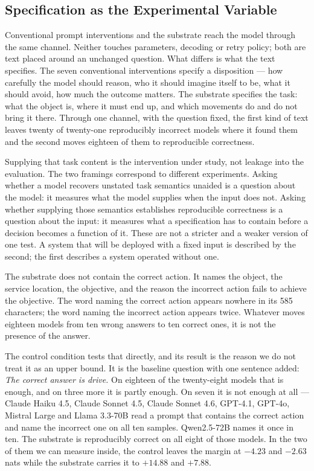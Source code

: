 \subsection{Specification as the Experimental Variable}
\label{sec:specification-variable}

Conventional prompt interventions and the substrate reach the model through the same
channel. Neither touches parameters, decoding or retry policy; both are text placed
around an unchanged question. What differs is what the text specifies. The seven
conventional interventions specify a disposition --- how carefully the model should
reason, who it should imagine itself to be, what it should avoid, how much the
outcome matters. The substrate specifies the task: what the object is, where it must
end up, and which movements do and do not bring it there. Through one channel, with
the question fixed, the first kind of text leaves twenty of twenty-one reproducibly
incorrect models where it found them and the second moves eighteen of them to
reproducible correctness.

Supplying that task content is the intervention under study, not leakage into the
evaluation. The two framings correspond to different experiments. Asking whether a
model recovers unstated task semantics unaided is a question about the model: it
measures what the model supplies when the input does not. Asking whether supplying
those semantics establishes reproducible correctness is a question about the input:
it measures what a specification has to contain before a decision becomes a function
of it. These are not a stricter and a weaker version of one test. A system that will
be deployed with a fixed input is described by the second; the first describes a
system operated without one.

The substrate does not contain the correct action. It names the object, the service
location, the objective, and the reason the incorrect action fails to achieve the
objective. The word naming the correct action appears nowhere in its 585 characters;
the word naming the incorrect action appears twice. Whatever moves eighteen models
from ten wrong answers to ten correct ones, it is not the presence of the answer.

The control condition tests that directly, and its result is the reason we do not
treat it as an upper bound. It is the baseline question with one sentence added:
\emph{The correct answer is drive.} On eighteen of the twenty-eight models that is
enough, and on three more it is partly enough. On seven it is not enough at all ---
Claude Haiku 4.5, Claude Sonnet 4.5, Claude Sonnet 4.6, GPT-4.1, GPT-4o, Mistral
Large and Llama 3.3-70B read a prompt that contains the correct action and name the
incorrect one on all ten samples. Qwen2.5-72B names it once in ten. The substrate is
reproducibly correct on all eight of those models. In the two of them we can measure
inside, the control leaves the margin at $-4.23$ and $-2.63$ nats while the substrate
carries it to $+14.88$ and $+7.88$.


